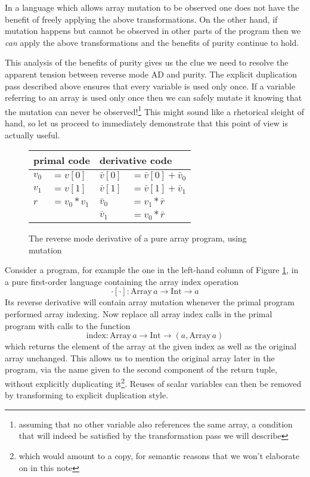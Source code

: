 \documentclass[12pt]{article}
\begin{document}
In a language which allows array mutation to be observed one does not
have the benefit of freely applying the above transformations.  On the
other hand, if mutation happens but cannot be observed in other parts
of the program then we \emph{can} apply the above transformations and
the benefits of purity continue to hold.

This analysis of the benefits of purity gives us the clue we need to
resolve the apparent tension between reverse mode AD and purity.  The
explicit duplication pass described above ensures that every variable
is used only once.  If a variable referring to an array is used only
once then we can safely mutate it knowing that the mutation can never
be observed!\footnote{assuming that no other variable also references
  the same array, a condition that will indeed be satisfied by the
  transformation pass we will describe} This might sound like a rhetorical
sleight of hand, so let us proceed to immediately demonstrate that
this point of view is actually useful.

\newcommand{\indexL}{\mathrm{index}}
\newcommand{\incL}{\mathrm{inc}}

\begin{figure}[t]
\center
\begin{tabular}[t]{ll|ll}
  \multicolumn{2}{l|}{primal code}
  &
  \multicolumn{2}{l}{derivative code}
  \\

  \hline

  $v_0$ & $= v[0]$
  &
  $\bar{v}[0]$ & $ = \bar{v}[0] + \bar{v}_0$
  \\
  
  $v_1$ & $ = v[1]$
  &
  $\bar{v}[1]$ & $ = \bar{v}[1] + \bar{v}_1$
  \\

  $r$ & $= v_0 * v_1$
  &
  $\bar{v}_0$ & $ = v_1 * \bar{r}$
  \\

  & &
  $\bar{v}_1$ & $ = v_0 * \bar{r}$
  \\
\end{tabular}
\caption{\label{array-program-mutating} The reverse mode derivative of
  a pure array program, using mutation}
\end{figure}

Consider a program, for example the one in the left-hand column of
Figure \ref{array-program-mutating}, in a pure first-order language
containing the array index operation
\[
\cdot[\cdot] : \mathrm{Array} \, a \to \mathrm{Int} \to a
\]
Its reverse derivative will contain array mutation whenever the primal
program performed array indexing.  Now replace all array index calls
in the primal program with calls to the function
\[
\indexL : \mathrm{Array} \, a \to \mathrm{Int} \to (a, \mathrm{Array}
\, a)
\]
which returns the element of the array at the given index as well as
the original array unchanged.  This allows us to mention the original
array later in the program, via the name given to the second component
of the return tuple, without explicitly duplicating it\footnote{which
  would amount to a copy, for semantic reasons that we won't elaborate
  on in this note}.  Reuses of scalar variables can then be removed by
transforming to explicit duplication style.
\end{document}

